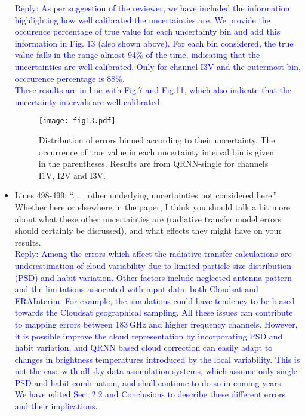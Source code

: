 \documentclass[11pt,a4paper]{article}
\begin{document}
\begin{itemize}
\textcolor{blue}{Reply: As per suggestion of the reviewer, we have included the information highlighting how well calibrated the uncertainties are. We provide the occurence percentage of true value for each uncertainty bin and add this information in Fig. 13 (also shown above). For each bin considered, the true value falls in the range almost 94\% of the time, indicating that the uncertainties are well calibrated. Only for channel I3V and the outermost bin, occcurence percentage is 88\%. \\	
These results are in line with Fig.7 and Fig.11, which also indicate that the uncertainty intervals are well calibrated.} \\
\begin{figure}
	\centering
	\texttt{[image: fig13.pdf]}
	\caption{Distribution of errors binned according to their uncertainty. The occurrence of true value in each uncertainty interval bin is given in the parentheses. Results are from QRNN-single for channels I1V, I2V and I3V.}
\end{figure}
\item  
			Lines 498-499: ``. . . other underlying uncertainties not considered here.'' Whether here or elsewhere in the paper, I think you should talk a bit more about what these other uncertainties are (radiative transfer model errors should certainly be discussed), and what effects they might have on your results.\\

\textcolor{blue}{Reply: Among the errors which affect the radiative transfer calculations are underestimation of cloud variability due to limited particle size distribution (PSD) and habit variation. Other factors include neglected antenna pattern and the limitations associated with input data, both Cloudsat and ERAInterim. For example, the simulations could have tendency to be biased towards the Cloudsat geographical sampling. All these issues can contribute to mapping errors between 183\,GHz  and higher frequency channels. However, it is possible improve the cloud representation by incorporating PSD and habit variation, and QRNN based cloud correction can easily adapt to changes in brightness temperatures introduced by the local variability.  This is not the case with all-sky data assimilation systems, which assume only single PSD and habit combination, and shall continue to do so in coming years.\\
We have edited Sect 2.2 and Conclusions to describe these different errors and their implications.  }	

\end{itemize}
	
\end{document}
